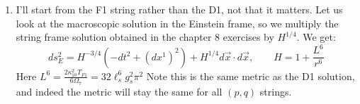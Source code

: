 \documentclass[11pt, class=article, crop=false]{standalone}
\begin{document}
\begin{enumerate}
	The only subtlety is that one must take care to include the Chern-Simons terms in the DBI action in order to get the full duality, specifically 
	\[
		\int C_0 \Tr [F \wedge F].
	\]
	At fixed $C_0 = \theta/2\pi$ this produces the instanton number. The duality $C_0 \to C_0 + 1$ is a bona-fide duality of the $\mathcal N=4$ theory, a consequence of the fact that instanton charge is quantized. 
	
	\textbf{Is there anything else that I can say that constitutes any form of ``showing'' that this fact is true?}
	\textbf{The only thing is I think I'm assuming that the D3 brane is the only object charged under $C_4$ at leading order in $\ell_s$. Can I safely assume this?}
	
	\item I'll start from the F1 string rather than the D1, not that it matters. Let us look at the macroscopic solution in the Einstein frame, so we multiply the string frame solution obtained in the chapter 8 exercises by $H^{1/4}$. We get:
	\[
		ds^2_E = H^{-3/4}(-dt^2 + (dx^1)^2)+ H^{1/4} d \vec x \cdot d \vec x, \qquad H = 1 + \frac{L^6}{r^6}
	\]
	Here $L^6 = \frac{2 \kappa_{10}^2 T_{F1}}{6 \Omega_7} = 32 \ell_s^6 g_s^2 \pi^2$ %
	Note this is the same metric as the D1 solution, and indeed the metric will stay the same for all $(p,q)$ strings.
	

\end{enumerate}
\end{document}
